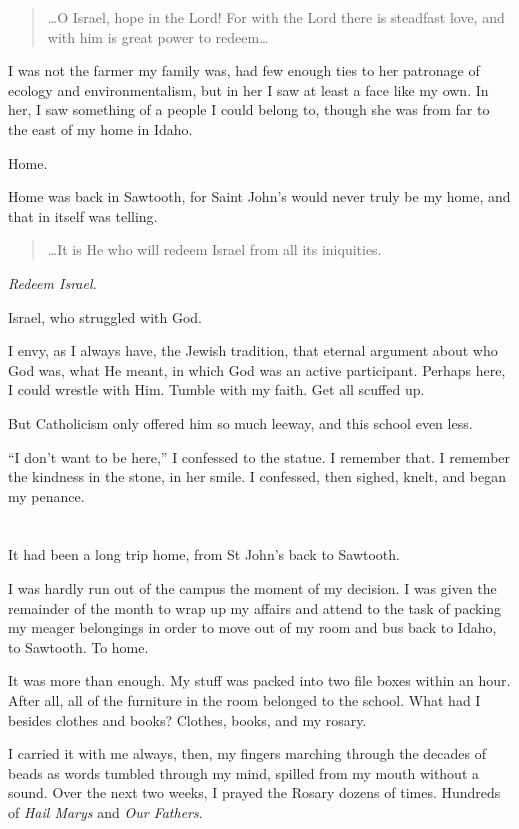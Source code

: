 \begin{quote}
\ldots O Israel, hope in the Lord! For with the Lord there is steadfast love, and with him is great power to redeem\ldots{}
\end{quote}

I was not the farmer my family was, had few enough ties to her patronage of ecology and environmentalism, but in her I saw at least a face like my own. In her, I saw something of a people I could belong to, though she was from far to the east of my home in Idaho.

Home.

Home was back in Sawtooth, for Saint John's would never truly be my home, and that in itself was telling.

\begin{quote}
\ldots It is He who will redeem Israel from all its iniquities.
\end{quote}

\emph{Redeem Israel.}

Israel, who struggled with God.

I envy, as I always have, the Jewish tradition, that eternal argument about who God was, what He meant, in which God was an active participant. Perhaps here, I could wrestle with Him. Tumble with my faith. Get all scuffed up.

But Catholicism only offered him so much leeway, and this school even less.

``I don't want to be here,'' I confessed to the statue. I remember that. I remember the kindness in the stone, in her smile. I confessed, then sighed, knelt, and began my penance.

\section{}

It had been a long trip home, from St John's back to Sawtooth.

I was hardly run out of the campus the moment of my decision. I was given the remainder of the month to wrap up my affairs and attend to the task of packing my meager belongings in order to move out of my room and bus back to Idaho, to Sawtooth. To home.

It was more than enough. My stuff was packed into two file boxes within an hour. After all, all of the furniture in the room belonged to the school. What had I besides clothes and books? Clothes, books, and my rosary.

I carried it with me always, then, my fingers marching through the decades of beads as words tumbled through my mind, spilled from my mouth without a sound. Over the next two weeks, I prayed the Rosary dozens of times. Hundreds of \emph{Hail Marys} and \emph{Our Fathers}.

